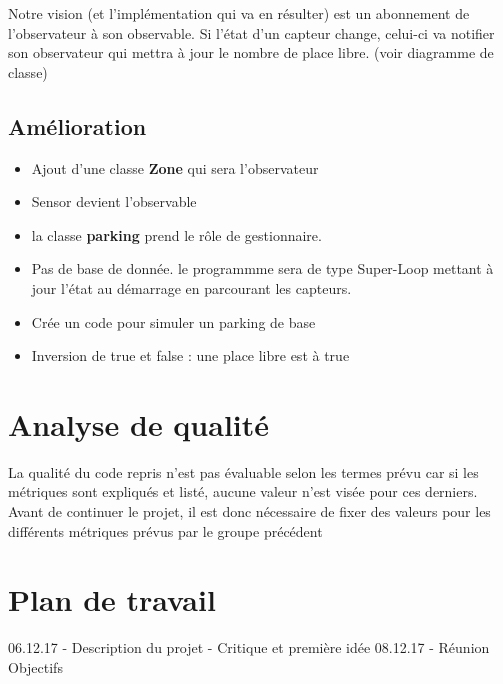 \documentclass[10pt,a4paper]{article}
\begin{document}
Notre vision (et l'implémentation qui va en résulter) est un abonnement de l'observateur à son observable. Si l'état d'un capteur change, celui-ci va notifier son observateur qui mettra à jour le nombre de place libre. (voir diagramme de classe)

\subsection{Amélioration}
\begin{itemize}
\item Ajout d'une classe \textbf{Zone} qui sera l'observateur

\item Sensor devient l'observable

\item la classe \textbf{parking} prend le rôle de gestionnaire. 

\item Pas de base de donnée. le programmme sera de type Super-Loop mettant à jour l'état au démarrage en parcourant les capteurs.

\item Crée un code pour simuler un parking de base

\item Inversion de true et false : une place libre est à true 
\end{itemize}

\section{Analyse de qualité}
La qualité du code repris n'est pas évaluable selon les termes prévu car si les métriques sont expliqués et listé, aucune valeur n'est visée pour ces derniers. Avant de continuer le projet, il est donc nécessaire de fixer des valeurs pour les différents métriques prévus par le groupe précédent

\section{Plan de travail}
06.12.17 - Description du projet - Critique et première idée
08.12.17 - Réunion Objectifs
\end{document}
